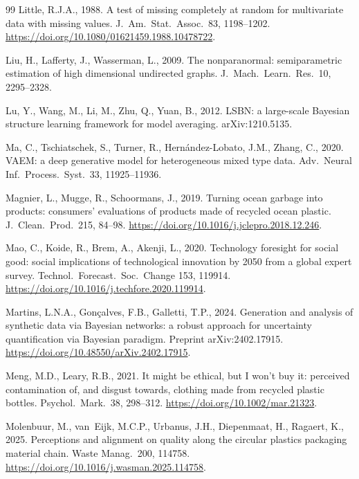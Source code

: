 \begin{thebibliography}{99}
Little, R.J.A., 1988. A test of missing completely at random for multivariate data with
missing values. J.\ Am.\ Stat.\ Assoc.\ 83, 1198--1202.
\url{https://doi.org/10.1080/01621459.1988.10478722}.

Liu, H., Lafferty, J., Wasserman, L., 2009. The nonparanormal: semiparametric estimation of
high dimensional undirected graphs. J.\ Mach.\ Learn.\ Res.\ 10, 2295--2328.

Lu, Y., Wang, M., Li, M., Zhu, Q., Yuan, B., 2012. LSBN: a large-scale Bayesian structure
learning framework for model averaging. arXiv:1210.5135.

Ma, C., Tschiatschek, S., Turner, R., Hern\'andez-Lobato, J.M., Zhang, C., 2020. VAEM: a deep
generative model for heterogeneous mixed type data. Adv.\ Neural Inf.\ Process.\ Syst.\ 33,
11925--11936.

Magnier, L., Mugge, R., Schoormans, J., 2019. Turning ocean garbage into products:
consumers' evaluations of products made of recycled ocean plastic. J.\ Clean.\ Prod.\ 215,
84--98. \url{https://doi.org/10.1016/j.jclepro.2018.12.246}.

Mao, C., Koide, R., Brem, A., Akenji, L., 2020. Technology foresight for social good:
social implications of technological innovation by 2050 from a global expert survey.
Technol.\ Forecast.\ Soc.\ Change 153, 119914.
\url{https://doi.org/10.1016/j.techfore.2020.119914}.

Martins, L.N.A., Gon\c{c}alves, F.B., Galletti, T.P., 2024. Generation and analysis of
synthetic data via Bayesian networks: a robust approach for uncertainty quantification via
Bayesian paradigm. Preprint arXiv:2402.17915.
\url{https://doi.org/10.48550/arXiv.2402.17915}.

Meng, M.D., Leary, R.B., 2021. It might be ethical, but I won't buy it: perceived
contamination of, and disgust towards, clothing made from recycled plastic bottles.
Psychol.\ Mark.\ 38, 298--312. \url{https://doi.org/10.1002/mar.21323}.

Molenbuur, M., van~Eijk, M.C.P., Urbanus, J.H., Diepenmaat, H., Ragaert, K., 2025.
Perceptions and alignment on quality along the circular plastics packaging material chain.
Waste Manag.\ 200, 114758. \url{https://doi.org/10.1016/j.wasman.2025.114758}.


\end{thebibliography}
